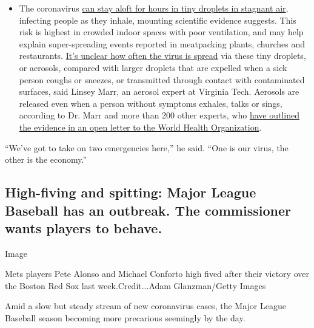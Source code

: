 \begin{itemize}
  \begin{itemize}
  \tightlist
  \item
    The coronavirus
    \href{https://www.nytimes3xbfgragh.onion/2020/07/04/health/239-experts-with-one-big-claim-the-coronavirus-is-airborne.html?action=click\&pgtype=Article\&state=default\&region=MAIN_CONTENT_3\&context=storylines_faq}{can
    stay aloft for hours in tiny droplets in stagnant air}, infecting
    people as they inhale, mounting scientific evidence suggests. This
    risk is highest in crowded indoor spaces with poor ventilation, and
    may help explain super-spreading events reported in meatpacking
    plants, churches and restaurants.
    \href{https://www.nytimes3xbfgragh.onion/2020/07/06/health/coronavirus-airborne-aerosols.html?action=click\&pgtype=Article\&state=default\&region=MAIN_CONTENT_3\&context=storylines_faq}{It's
    unclear how often the virus is spread} via these tiny droplets, or
    aerosols, compared with larger droplets that are expelled when a
    sick person coughs or sneezes, or transmitted through contact with
    contaminated surfaces, said Linsey Marr, an aerosol expert at
    Virginia Tech. Aerosols are released even when a person without
    symptoms exhales, talks or sings, according to Dr. Marr and more
    than 200 other experts, who
    \href{https://academic.oup.com/cid/article/doi/10.1093/cid/ciaa939/5867798}{have
    outlined the evidence in an open letter to the World Health
    Organization}.
  \end{itemize}
\end{itemize}

``We've got to take on two emergencies here,'' he said. ``One is our
virus, the other is the economy.''

\hypertarget{high-fiving-and-spitting-major-league-baseball-has-an-outbreak-the-commissioner-wants-players-to-behave}{%
\subsection{High-fiving and spitting: Major League Baseball has an
outbreak. The commissioner wants players to
behave.}\label{high-fiving-and-spitting-major-league-baseball-has-an-outbreak-the-commissioner-wants-players-to-behave}}

Image

Mets players Pete Alonso and Michael Conforto high fived after their
victory over the Boston Red Sox last week.Credit...Adam Glanzman/Getty
Images

Amid a slow but steady stream of new coronavirus cases, the Major League
Baseball season becoming more precarious seemingly by the day.

